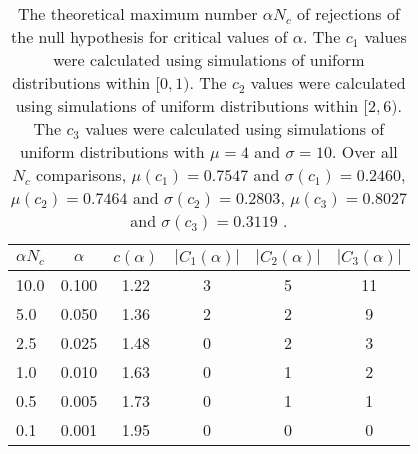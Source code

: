 \begin{table}[h!]
\begin{center}
\begin{tabular}{| l | c | c | c | c | c |}\hline
$\alpha N_c$ & $\alpha$ & $c(\alpha)$ & $|C_1(\alpha)|$ & $|C_2(\alpha)|$ & $|C_3(\alpha)|$ \\\hline
10.0 & 0.100 & 1.22 & 3 & 5 & 11 \\\hline
5.0 & 0.050 & 1.36 & 2 & 2 & 9 \\\hline
2.5 & 0.025 & 1.48 & 0 & 2 & 3 \\\hline
1.0 & 0.010 & 1.63 & 0 & 1 & 2 \\\hline
0.5 & 0.005 & 1.73 & 0 & 1 & 1 \\\hline
0.1 & 0.001 & 1.95 & 0 & 0 & 0 \\\hline
\end{tabular}
\caption{The theoretical maximum number $\alpha N_c$ of rejections
of the null hypothesis for critical values of $\alpha$.
The $c_1$ values were calculated using simulations of uniform distributions within $[0,1)$.
The $c_2$ values were calculated using simulations of uniform distributions within $[2,6)$.
The $c_3$ values were calculated using simulations of uniform distributions with $\mu=4$ and $\sigma=10$.
Over all $N_c$ comparisons,
 $\mu(c_1)=0.7547$ and $\sigma(c_1)=0.2460$,
 $\mu(c_2)=0.7464$ and $\sigma(c_2)=0.2803$,
 $\mu(c_3)=0.8027$ and $\sigma(c_3)=0.3119$ .
}
\end{center}
\end{table}